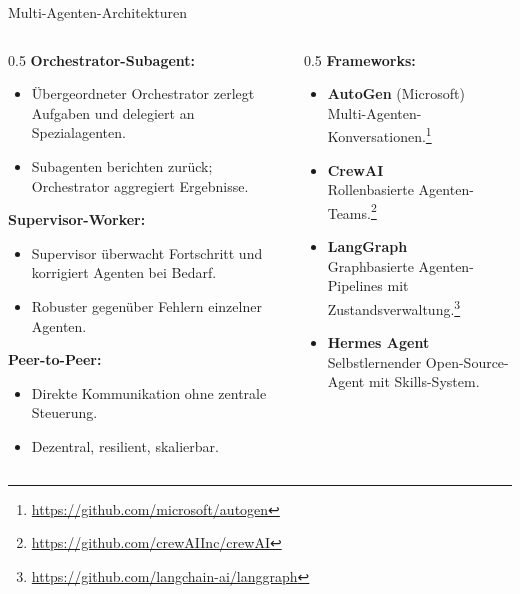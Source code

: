 \documentclass[aspectratio=1610, xcolor=dvipsnames, 9pt]{beamer}
\begin{document}
\begin{frame}{Multi-Agenten-Architekturen}
  \begin{columns}
    \begin{column}{0.5\textwidth}
      \textbf{Orchestrator-Subagent:}
      \begin{itemize}
        \item Übergeordneter Orchestrator zerlegt Aufgaben und delegiert an Spezialagenten.
        \item Subagenten berichten zurück; Orchestrator aggregiert Ergebnisse.
      \end{itemize}
      \vspace{0.3cm}
      \textbf{Supervisor-Worker:}
      \begin{itemize}
        \item Supervisor überwacht Fortschritt und korrigiert Agenten bei Bedarf.
        \item Robuster gegenüber Fehlern einzelner Agenten.
      \end{itemize}
      \vspace{0.3cm}
      \textbf{Peer-to-Peer:}
      \begin{itemize}
        \item Direkte Kommunikation ohne zentrale Steuerung.
        \item Dezentral, resilient, skalierbar.
      \end{itemize}
    \end{column}
    \begin{column}{0.5\textwidth}
      \textbf{Frameworks:}
      \begin{itemize}
        \item \textbf{AutoGen} (Microsoft)\\Multi-Agenten-Konversationen.\footnote{\url{https://github.com/microsoft/autogen}}
        \item \textbf{CrewAI}\\Rollenbasierte Agenten-Teams.\footnote{\url{https://github.com/crewAIInc/crewAI}}
        \item \textbf{LangGraph}\\Graphbasierte Agenten-Pipelines mit Zustandsverwaltung.\footnote{\url{https://github.com/langchain-ai/langgraph}}
        \item \textbf{Hermes Agent}\\Selbstlernender Open-Source-Agent mit Skills-System.
      \end{itemize}
    \end{column}
  \end{columns}
\end{frame}
\end{document}
